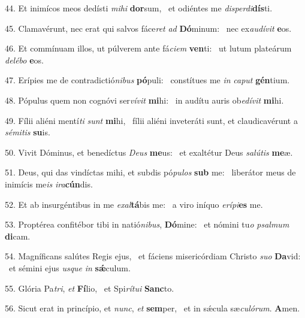 44. Et inimícos meos dedísti \textit{mi}\textit{hi} \textbf{dor}sum, \ast\  et odiéntes me \textit{dis}\textit{per}\textit{di}\textbf{dís}ti.\

45. Clamavérunt, nec erat qui salvos fáce\textit{ret} \textit{ad} \textbf{Dó}minum: \ast\  nec ex\textit{au}\textit{dí}\textit{vit} \textbf{e}os.\

46. Et commínuam illos, ut púlverem ante fá\textit{ci}\textit{em} \textbf{ven}ti: \ast\  ut lutum plateárum \textit{de}\textit{lé}\textit{bo} \textbf{e}os.\

47. Erípies me de contradictió\textit{ni}\textit{bus} \textbf{pó}puli: \ast\  constítues me \textit{in} \textit{ca}\textit{put} \textbf{gén}tium.\

48. Pópulus quem non cognóvi ser\textit{ví}\textit{vit} \textbf{mi}hi: \ast\  in audítu auris ob\textit{e}\textit{dí}\textit{vit} \textbf{mi}hi.\

49. Fílii aliéni mentí\textit{ti} \textit{sunt} \textbf{mi}hi, \ast\  fílii aliéni inveteráti sunt, et claudicavérunt a \textit{sé}\textit{mi}\textit{tis} \textbf{su}is.\

50. Vivit Dóminus, et benedíctus \textit{De}\textit{us} \textbf{me}us: \ast\  et exaltétur Deus \textit{sa}\textit{lú}\textit{tis} \textbf{me}æ.\

51. Deus, qui das vindíctas mihi, et subdis pó\textit{pu}\textit{los} \textbf{sub} me: \ast\  liberátor meus de inimícis me\textit{is} \textit{i}\textit{ra}\textbf{cún}dis.\

52. Et ab insurgéntibus in me \textit{ex}\textit{al}\textbf{tá}bis me: \ast\  a viro iníquo \textit{e}\textit{rí}\textit{pi}\textbf{es} me.\

53. Proptérea confitébor tibi in natió\textit{ni}\textit{bus}, \textbf{Dó}mine: \ast\  et nómini tu\textit{o} \textit{psal}\textit{mum} \textbf{di}cam.\

54. Magníficans salútes Regis ejus, \dag\  et fáciens misericórdiam Christo \textit{su}\textit{o} \textbf{Da}vid: \ast\  et sémini ejus \textit{us}\textit{que} \textit{in} \textbf{sǽ}culum.\

55. Glória Pa\textit{tri}, \textit{et} \textbf{Fí}lio, \ast\  et Spi\textit{rí}\textit{tu}\textit{i} \textbf{Sanc}to.\

56. Sicut erat in princípio, et \textit{nunc}, \textit{et} \textbf{sem}per, \ast\  et in sǽcula sæ\textit{cu}\textit{ló}\textit{rum}. \textbf{A}men.\

